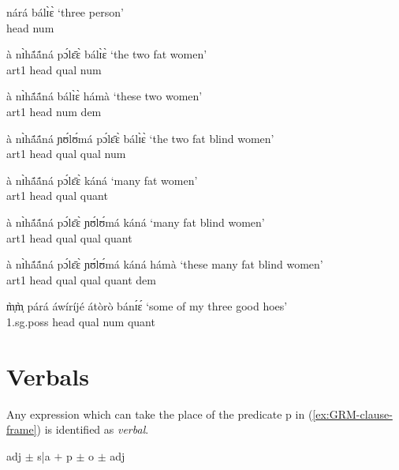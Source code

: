 \begin{exe}
\begin{exe}
\begin{exe}
{\begin{exe}
\begin{exe}
\begin{exe}
\begin{exe}
\begin{exe}
\begin{exe}
\begin{exe}
\begin{xlist}
\begin{exe}
\begin{exe}
\begin{exe}
\begin{exe}
\begin{exe}
\begin{exe}
\begin{exe}
\begin{exe}
\begin{exe}
\begin{exe}
\begin{exe}
\begin{exe}
\begin{exe}
  \ex\label{ex:GRM-hn} 
nárá bálɪ̀ɛ̀   {\rm  `three person'} \\  
  {\sc head} {\sc num}  

  \ex\label{ex:GRM-ahqln} 
à nɪ̀hã́ã́ná pɔ́lɛ̄ɛ̀ bálɪ̀ɛ̀  {\rm  `the two fat women'}  \\ 
 {\sc art1} {\sc head} {\sc qual} {\sc num}  

  \ex\label{ex:GRM-ahqlnd}
  à nɪ̀hã́ã́ná bálɪ̀ɛ̀ hámà  {\rm  `these two women'} \\ 
 {\sc art1} {\sc head} {\sc num} {\sc dem}  

  \ex\label{ex:GRM-ahqlqln}
à nɪ̀hã́ã́ná  ɲʊ́lʊ́má pɔ́lɛ̄ɛ̀ bálɪ̀ɛ̀  {\rm  `the two fat blind women'} 
 \\
  {\sc art1} {\sc head}  {\sc qual} {\sc qual}  {\sc num}  

\ex\label{ex:GRM-ahqlq} 
à nɪ̀hã́ã́ná pɔ́lɛ̄ɛ̀ káná   {\rm  `many fat women'}  \\  
{\sc art1} {\sc head} {\sc qual} {\sc quant}  

 \ex\label{ex:GRM-ahqlqlq} 
à nɪ̀hã́ã́ná pɔ́lɛ̄ɛ̀  ɲʊ́lʊ́má  káná   {\rm  `many fat blind women'}   
\\ 
{\sc art1} {\sc head} {\sc qual} {\sc qual} {\sc quant}  

  \ex\label{ex:GRM-ahqlqlqd} 
à nɪ̀hã́ã́ná pɔ́lɛ̄ɛ̀  ɲʊ́lʊ́má  káná  hámà   {\rm  `these many fat 
blind 
women'}  \\ 
{\sc art1} {\sc head} {\sc qual} {\sc qual} {\sc quant}  {\sc dem}

 \ex\label{ex:GRM-phqlnq} 
m̩̀m̩̀ párá áwíríjé átòrò bánɪ́ɛ́  {\rm  `some of my three good 
hoes'} \\ 
{\sc 1.sg.poss} {\sc head} {\sc qual} {\sc num} {\sc quant}

 
\z 
 \z



\section{Verbals}
\label{sec:GRM-verbals}

% 
Any expression which can take
the place of  the predicate {\sc p} in  (\ref{ex:GRM-clause-frame}) is 
identified as  \textit{verbal}.


\begin{exe}
  \label{ex:GRM-clause-frame-2}
 {\sc adj}  $\pm$ {\sc s|a}  $+$ {\sc p} $\pm$ {\sc o} $\pm$ {\sc adj} 
\end{exe}



\end{exe}
\end{exe}
\end{exe}
\end{exe}
\end{exe}
\end{exe}
\end{exe}
\end{exe}
\end{exe}
\end{exe}
\end{exe}
\end{exe}
\end{exe}
\end{xlist}
\end{exe}
\end{exe}
\end{exe}
\end{exe}
\end{exe}
\end{exe}
\end{exe}}
\end{exe}
\end{exe}
\end{exe}
